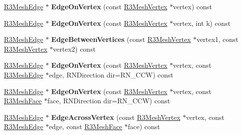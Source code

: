 \begin{DoxyCompactItemize}
\item 
\hyperlink{class_r3_mesh_edge}{R3\+Mesh\+Edge} $\ast$ {\bfseries Edge\+On\+Vertex} (const \hyperlink{class_r3_mesh_vertex}{R3\+Mesh\+Vertex} $\ast$vertex) const \hypertarget{class_r3_mesh_a2a1f5aed957916261d12a349b5fea248}{}\label{class_r3_mesh_a2a1f5aed957916261d12a349b5fea248}

\item 
\hyperlink{class_r3_mesh_edge}{R3\+Mesh\+Edge} $\ast$ {\bfseries Edge\+On\+Vertex} (const \hyperlink{class_r3_mesh_vertex}{R3\+Mesh\+Vertex} $\ast$vertex, int k) const \hypertarget{class_r3_mesh_aa236e5d8bf2811febe841851c65017f3}{}\label{class_r3_mesh_aa236e5d8bf2811febe841851c65017f3}

\item 
\hyperlink{class_r3_mesh_edge}{R3\+Mesh\+Edge} $\ast$ {\bfseries Edge\+Between\+Vertices} (const \hyperlink{class_r3_mesh_vertex}{R3\+Mesh\+Vertex} $\ast$vertex1, const \hyperlink{class_r3_mesh_vertex}{R3\+Mesh\+Vertex} $\ast$vertex2) const \hypertarget{class_r3_mesh_a23098625b31f757682507f21ce4dbf2c}{}\label{class_r3_mesh_a23098625b31f757682507f21ce4dbf2c}

\item 
\hyperlink{class_r3_mesh_edge}{R3\+Mesh\+Edge} $\ast$ {\bfseries Edge\+On\+Vertex} (const \hyperlink{class_r3_mesh_vertex}{R3\+Mesh\+Vertex} $\ast$vertex, const \hyperlink{class_r3_mesh_edge}{R3\+Mesh\+Edge} $\ast$edge, R\+N\+Direction dir=R\+N\+\_\+\+C\+CW) const \hypertarget{class_r3_mesh_aac8e649b51dc9204d988802656318c82}{}\label{class_r3_mesh_aac8e649b51dc9204d988802656318c82}

\item 
\hyperlink{class_r3_mesh_edge}{R3\+Mesh\+Edge} $\ast$ {\bfseries Edge\+On\+Vertex} (const \hyperlink{class_r3_mesh_vertex}{R3\+Mesh\+Vertex} $\ast$vertex, const \hyperlink{class_r3_mesh_face}{R3\+Mesh\+Face} $\ast$face, R\+N\+Direction dir=R\+N\+\_\+\+C\+CW) const \hypertarget{class_r3_mesh_a954cbbce11031ae7b9dc2bf46487e1c1}{}\label{class_r3_mesh_a954cbbce11031ae7b9dc2bf46487e1c1}

\item 
\hyperlink{class_r3_mesh_edge}{R3\+Mesh\+Edge} $\ast$ {\bfseries Edge\+Across\+Vertex} (const \hyperlink{class_r3_mesh_vertex}{R3\+Mesh\+Vertex} $\ast$vertex, const \hyperlink{class_r3_mesh_edge}{R3\+Mesh\+Edge} $\ast$edge, const \hyperlink{class_r3_mesh_face}{R3\+Mesh\+Face} $\ast$face) const \hypertarget{class_r3_mesh_ad54461fa7bbcd97dbda2d7f474f59913}{}\label{class_r3_mesh_ad54461fa7bbcd97dbda2d7f474f59913}


\end{DoxyCompactItemize}
